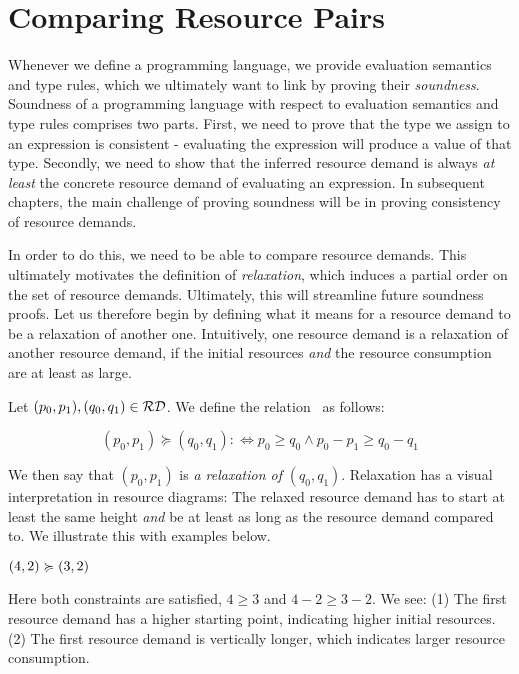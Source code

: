 \section{Comparing Resource Pairs}

Whenever we define a programming language, we provide evaluation semantics and type rules, which we ultimately want to link by proving their \emph{soundness}. Soundness of a programming language with respect to evaluation semantics and type rules comprises two parts. First, we need to prove that the type we assign to an expression is consistent - evaluating the expression will produce a value of that type. Secondly, we need to show that the inferred resource demand is always \emph{at least} the concrete resource demand of evaluating an expression. In subsequent chapters, the main challenge of proving soundness will be in proving consistency of resource demands. 

In order to do this, we need to be able to compare resource demands. This ultimately motivates the definition of \emph{relaxation}, which induces a partial order on the set of resource demands. Ultimately, this will streamline future soundness proofs. Let us therefore begin by defining what it means for a resource demand to be a relaxation of another one. Intuitively, one resource demand is a relaxation of another resource demand, if the initial resources \emph{and} the resource consumption are at least as large.

\begin{definition}[Relaxation]\label{def:relaxation}
   Let \((p_0, p_1), (q_0, q_1) \in \mathcal{RD}\). We define the relation \relaxation ~as follows:

   \[
      (p_0, p_1) \succcurlyeq (q_0, q_1) :\iff p_0 \geq q_0 \wedge p_0 - p_1 \geq q_0 - q_1
   \]
\end{definition}

We then say that \((p_0, p_1)\) is \emph{a relaxation of} \((q_0, q_1)\). Relaxation has a visual interpretation in resource diagrams: The relaxed resource demand has to start at least the same height \emph{and} be at least as long as the resource demand compared to. We illustrate this with examples below.

\begin{example}
   \((4, 2) \succcurlyeq (3, 2)\)
\end{example}

Here both constraints are satisfied, \(4 \geq 3\) and \(4 - 2 \geq 3 - 2\). We see: (1) The first resource demand has a higher starting point, indicating higher initial resources. (2) The first resource demand is vertically longer, which indicates larger resource consumption.

